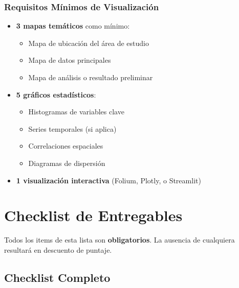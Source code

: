 \documentclass[11pt,letterpaper]{article}
\begin{document}
\subsubsection{Requisitos Mínimos de Visualización}

\begin{itemize}
    \item \textbf{3 mapas temáticos} como mínimo:
    \begin{itemize}
        \item Mapa de ubicación del área de estudio
        \item Mapa de datos principales
        \item Mapa de análisis o resultado preliminar
    \end{itemize}
    \item \textbf{5 gráficos estadísticos}:
    \begin{itemize}
        \item Histogramas de variables clave
        \item Series temporales (si aplica)
        \item Correlaciones espaciales
        \item Diagramas de dispersión
    \end{itemize}
    \item \textbf{1 visualización interactiva} (Folium, Plotly, o Streamlit)
\end{itemize}

\section{Checklist de Entregables}

\begin{warning}
Todos los items de esta lista son \textbf{obligatorios}. La ausencia de cualquiera resultará en descuento de puntaje.
\end{warning}

\subsection{Checklist Completo}
\end{document}
